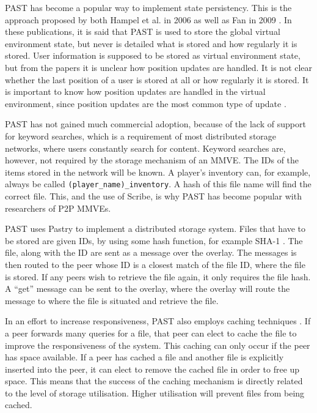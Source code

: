 PAST has become a popular way to implement state persistency. This is the approach proposed by both Hampel et al. in 2006 \cite{past_storage_focus} as well as Fan in 2009 \cite{Fan_phd}. In these publications, it is said that PAST is used to store the global virtual environment state, but never is detailed what is stored and how regularly it is stored. User information is supposed to be stored as virtual environment state, but from the papers it is unclear how position updates are handled. It is not clear whether the last position of a user is stored at all or how regularly it is stored. It is important to know how position updates are handled in the virtual environment, since position updates are the most common type of update \cite{knutsson_p2p_first}.

PAST has not gained much commercial adoption, because of the lack of support for keyword searches, which is a requirement of most distributed storage networks, where users constantly search for content. Keyword searches are, however, not required by the storage mechanism of an MMVE. The IDs of the items stored in the network will be known. A player's inventory can, for example, always be called \verb.(player_name)_inventory.. A hash of this file name will find the correct file. This, and the use of Scribe, is why PAST has become popular with researchers of P2P MMVEs.

PAST \cite{PAST_storage} uses Pastry to implement a distributed storage system. Files that have to be stored are given IDs, by using some hash function, for example SHA-1 \cite{SHA}. The file, along with the ID are sent as a message over the overlay. The messages is then routed to the peer whose ID is a closest match of the file ID, where the file is stored. If any peers wish to retrieve the file again, it only requires the file hash. A ``get'' message can be sent to the overlay, where the overlay will route the message to where the file is situated and retrieve the file.

In an effort to increase responsiveness, PAST also employs caching techniques \cite{storage_and_chaching_PAST}. If a peer forwards many queries for a file, that peer can elect to cache the file to improve the responsiveness of the system. This caching can only occur if the peer has space available. If a peer has cached a file and another file is explicitly inserted into the peer, it can elect to remove the cached file in order to free up space. This means that the success of the caching mechanism is directly related to the level of storage utilisation. Higher utilisation will prevent files
from being cached.

